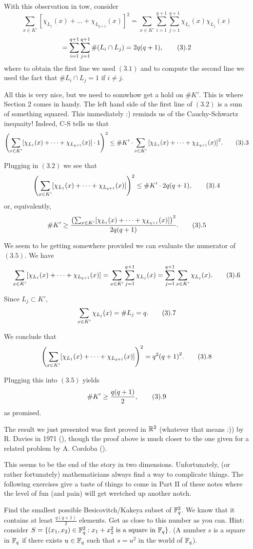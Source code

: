 With this observation in tow, consider
$$ \sum_{x \in K'} {[\chi_{L_1}(x)+\dots+\chi_{L_{q+1}}(x)]}^2=\sum_{x
\in K'} \sum_{i=1}^{q+1} \sum_{j=1}^{q+1} \chi_{L_i}(x)\chi_{L_j}(x)$$
$$=\sum_{i=1}^{q+1} \sum_{j=1}^{q+1} \# (L_i \cap L_j)=2q(q+1), \tag3.2$$
where to obtain the first line we used $(3.1)$ and to compute the second
line we used the fact that $\# L_i \cap L_j=1$ if $i \not=j$.

All this is very nice, but we need to somwhow get a hold on $\# K'$. This
is where Section 2 comes in handy. The left hand side of the first line
of $(3.2)$ is a sum of something squared. This immediately :) reminds us
of the Cauchy-Schwartz inequaity! Indeed, C-S tells us that
$$ {\left(\sum_{x \in K'} [\chi_{L_1}(x)+\dots+\chi_{L_{q+1}}(x)] \cdot 1
\right)}^2 \leq \# K' \cdot \sum_{x \in K'}
{[\chi_{L_1}(x)+\dots+\chi_{L_{q+1}}(x)]}^2. \tag3.3$$

Plugging in $(3.2)$ we see that
$$ {\left(\sum_{x \in K'} [\chi_{L_1}(x)+\dots+\chi_{L_{q+1}}(x)]
\right)}^2 \leq \# K' \cdot 2q(q+1), \tag3.4$$ or, equivalently,
$$ \# K' \ge \frac{{\left(\sum_{x \in K'}
[\chi_{L_1}(x)+\dots+\chi_{L_{q+1}}(x)] \right)}^2}{2q(q+1)}. \tag3.5$$

We seem to be getting somewhere provided we can evaluate the numerator of
$(3.5)$. We have
$$ \sum_{x \in K'} [\chi_{L_1}(x)+\dots+\chi_{L_{q+1}}(x)]=\sum_{x \in
K'} \sum_{j=1}^{q+1} \chi_{L_j}(x)=\sum_{j=1}^{q+1} \sum_{x \in K'}
\chi_{L_j}(x). \tag3.6$$

Since $L_j \subset K'$,
$$ \sum_{x \in K'} \chi_{L_j}(x)=\# L_j=q. \tag3.7$$

We conclude that
$$ {\left(\sum_{x \in K'} [\chi_{L_1}(x)+\dots+\chi_{L_{q+1}}(x)]
\right)}^2=q^2{(q+1)}^2. \tag3.8$$

Plugging this into $(3.5)$ yields
$$ \# K' \ge \frac{q(q+1)}{2}, \tag3.9$$ as promised.

The result we just presented was first proved in ${\Bbb R}^2$ (whatever
that means :)) by R. Davies in 1971 (\cite{D71}), though the proof above
is much closer to the one given for a related problem by A. Cordoba
(\cite{C77}). 

This seems to be the end of the story in two dimensions. Unfortunately,
(or rather fortunately) mathematicians always find a way to complicate
things. The following exercises give a taste of things to come in Part II
of these notes where the level of fun (and pain) will get wretched up
another notch.

 Find the smallest possible Besicovitch/Kakeya
subset of ${\Bbb F}_q^2$. We know that it contains at least
$\frac{q(q+1)}{2}$ elements. Get as close to this number as you can.
Hint: consider $S=\{(x_1,x_2) \in {\Bbb F}_q^2: x_1+x_2^2 \ \text{is a
square in} \ {\Bbb F}_q\}$. (A number $s$ is a square in ${\Bbb F}_q$ if
there exists $u \in {\Bbb F}_q$ such that $s=u^2$ in the world of ${\Bbb
F}_q$). \endproclaim

